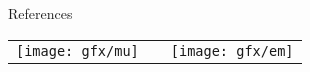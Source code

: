 \documentclass[final]{beamer}
\newlength{\onecolwid}
\begin{document}
\begin{frame}[t]
\begin{columns}[t]
\begin{column}{\onecolwid}
\begin{block}{References}
\end{block}

%
%
%


%
%

\begin{center}
\begin{tabular}{ccc}
\texttt{[image: gfx/mu]} & \hfill & \texttt{[image: gfx/em]}
\end{tabular}
\end{center}


\end{column} %

\end{columns} %

\end{frame} %
\end{document}
